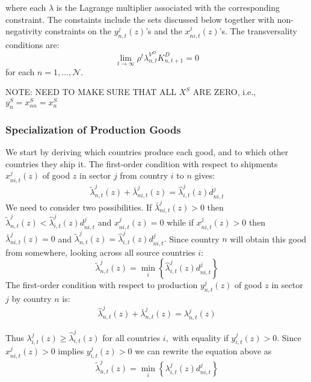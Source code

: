 \documentclass[12pt, bibtotoc, tablecaptionabove, figurecaptionabove, fleqn]{article}
\begin{document}
where each $\lambda$ is the Lagrange multiplier associated with the corresponding constraint. The constaints include the sets discussed below together with non-negativity constraints on the $y_{n, t}^{j}(z)$'s and the $x_{n i, t}^{j}(z)$'s. The transversality conditions are:
$$
\lim _{t \rightarrow \infty} \rho^{t} \lambda_{n, t}^{V^{D}} K_{n, t+1}^{D}=0
$$
for each $n=1, \ldots, \mathcal{N}$.


NOTE: NEED TO MAKE SURE THAT ALL $X^S$ ARE ZERO, i.e., $y_n^S = x_{nn}^S = x_{n}^S$

\subsubsection{Specialization of Production Goods}
We start by deriving which countries produce each good, and to which other countries they ship it. The first-order condition with respect to shipments $x_{n i, t}^{j}(z)$ of good $z$ in sector $j$ from country
$i$ to $n$ gives:
\begin{equation*}
	\tilde{\lambda}_{n, t}^{j}(z)+\bar{\lambda}_{n i, t}^{j}(z)=\hat{\lambda}_{i, t}^{j}(z) d_{n i, t}^{j}
\end{equation*}
We need to consider two possibilities. If $\bar{\lambda}_{n i, t}^{j}(z)>0$ then $\tilde{\lambda}_{n, t}^{j}(z)<\hat{\lambda}_{i, t}^{j}(z) d_{n i, t}^{j}$ and $x_{n i, t}^{j}(z)=0$
while if $x_{n i, t}^{j}(z)>0$ then $\bar{\lambda}_{n i, t}^{j}(z)=0$ and $\tilde{\lambda}_{n, t}^{j}(z)=\hat{\lambda}_{i, t}^{j}(z) d_{n i, t}^{j} .$ Since country $n$ will obtain this
good from somewhere, looking across all source countries $i:$
\begin{equation*}
	\tilde{\lambda}_{n, t}^{j}(z)=\min _{i}\left\{\hat{\lambda}_{i, t}^{j}(z) d_{n i, t}^{j}\right\}
\end{equation*}
The first-order condition with respect to production $y_{n, t}^{j}(z)$ of good $z$ in sector $j$ by country
$n$ is:
\begin{equation*}
	\hat{\lambda}_{n, t}^{j}(z)+\bar{\lambda}_{n, t}^{j}(z)=\lambda_{n, t}^{j}(z)
\end{equation*}

Thus $\lambda_{i, t}^{j}(z) \geq \hat{\lambda}_{i, t}^{j}(z)$ for all countries $i,$ with equality if $y_{i, t}^{j}(z)>0 .$ Since $x_{n i, t}^{j}(z)>0$ implies $y_{i, t}^{j}(z)>0$ we can rewrite the equation above as
\begin{equation}\label{eq:eq1}
	\tilde{\lambda}_{n, t}^{j}(z)=\min _{i}\left\{\lambda_{i, t}^{j}(z) d_{n i, t}^{j}\right\}
\end{equation}
\end{document}
